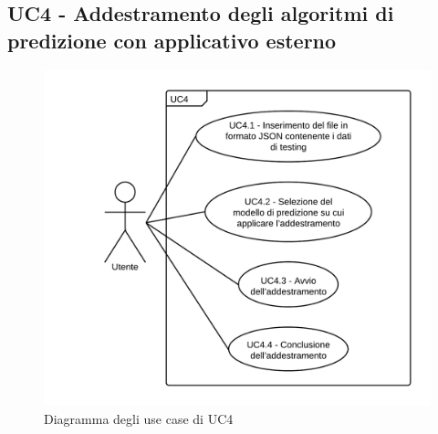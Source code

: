 \subsection{UC4 - Addestramento degli algoritmi di predizione con applicativo esterno}
\begin{figure}[H]
\includegraphics{img/UC4_-_Addestramento_degli_algoritmi_di_predizione_con_applicativo_esterno.png}
\caption{Diagramma degli use case di UC4}
\end{figure}
